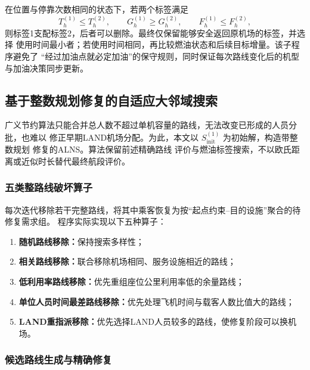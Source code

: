\documentclass[UTF8,a4paper,zihao=5]{ctexart}
\begin{document}
在位置与停靠次数相同的状态下，若两个标签满足
\begin{equation}
  T_h^{(1)}\le T_h^{(2)},
  \qquad
  G_h^{(1)}\ge G_h^{(2)},
  \qquad
  F_h^{(1)}\le F_h^{(2)},
  \label{eq:q1-label-dominance}
\end{equation}
则标签1支配标签2，后者可以删除。最终仅保留能够安全返回原机场的标签，并选择
使用时间最小者；若使用时间相同，再比较燃油状态和后续目标增量。该子程序避免了
“经过加油点就必定加油”的保守规则，同时保证每次路线变化后的机型与加油决策同步更新。

\subsection{基于整数规划修复的自适应大邻域搜索}

广义节约算法只能合并总人数不超过单机容量的路线，无法改变已形成的人员分批，也难以
修正早期LAND机场分配。为此，本文以 $S_{\mathrm{init}}^{(1)}$ 为初始解，构造带整数规划
修复的ALNS\citep{shaw1998lns,ropke2006alns,pisinger2010lns}。算法保留前述精确路线
评价与燃油标签搜索，不以欧氏距离或近似时长替代最终航段评价。

\subsubsection{五类整路线破坏算子}

每次迭代移除若干完整路线，将其中乘客恢复为按“起点约束--目的设施”聚合的待修复需求组。
程序实际实现以下五种算子：
\begin{enumerate}[label=\arabic*.]
  \item \textbf{随机路线移除：}保持搜索多样性；
  \item \textbf{相关路线移除：}联合移除机场相同、服务设施相近的路线；
  \item \textbf{低利用率路线移除：}优先重组座位公里利用率低的余量路线；
  \item \textbf{单位人员时间最差路线移除：}优先处理飞机时间与载客人数比值大的路线；
  \item \textbf{LAND重指派移除：}优先选择LAND人员较多的路线，使修复阶段可以换机场。
\end{enumerate}

\subsubsection{候选路线生成与精确修复}
\end{document}
